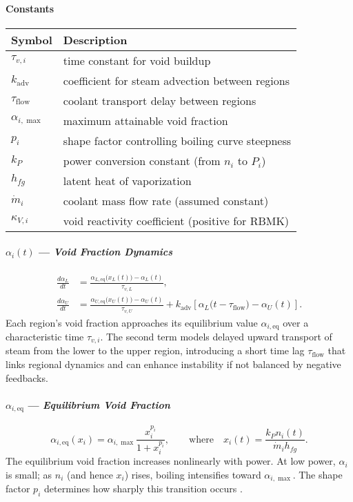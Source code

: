 \documentclass[11pt]{article}
\begin{document}
\paragraph{\textbf{Constants}}
\begin{center}
\begin{tabular}{@{}ll@{}}
\toprule
\textbf{Symbol} & \textbf{Description} \\
\midrule
$\tau_{v,i}$ & time constant for void buildup \\
$k_{\mathrm{adv}}$ & coefficient for steam advection between regions \\
$\tau_{\mathrm{flow}}$ & coolant transport delay between regions \\
$\alpha_{i,\max}$ & maximum attainable void fraction \\
$p_i$ & shape factor controlling boiling curve steepness \\
$k_P$ & power conversion constant (from $n_i$ to $P_i$) \\
$h_{fg}$ & latent heat of vaporization \\
$\dot{m}_i$ & coolant mass flow rate (assumed constant) \\
$\kappa_{V,i}$ & void reactivity coefficient (positive for RBMK) \\
\bottomrule
\end{tabular}
\end{center}

\paragraph{\textbf{$\alpha_i(t)$ --- \textit{Void Fraction Dynamics}}}
\begin{align}
\frac{d\alpha_L}{dt} &= 
\frac{\alpha_{L,\mathrm{eq}}\big(x_L(t)\big) - \alpha_L(t)}{\tau_{v,L}}, \\[3pt]
\frac{d\alpha_U}{dt} &= 
\frac{\alpha_{U,\mathrm{eq}}\big(x_U(t)\big) - \alpha_U(t)}{\tau_{v,U}} 
+ k_{\mathrm{adv}}\left[\alpha_L\big(t - \tau_{\mathrm{flow}}\big) - \alpha_U(t)\right].
\end{align}
Each region’s void fraction approaches its equilibrium value $\alpha_{i,\mathrm{eq}}$ over a characteristic time $\tau_{v,i}$. The second term models delayed upward transport of steam from the lower to the upper region, introducing a short time lag $\tau_{\mathrm{flow}}$ that links regional dynamics and can enhance instability if not balanced by negative feedbacks.

\paragraph{\textbf{$\alpha_{i,\mathrm{eq}}$ --- \textit{Equilibrium Void Fraction}}}
\begin{equation}
\alpha_{i,\mathrm{eq}}(x_i) = 
\alpha_{i,\max} \frac{x_i^{p_i}}{1 + x_i^{p_i}}, 
\qquad 
\text{where} \quad x_i(t) = \frac{k_P n_i(t)}{\dot{m}_i h_{fg}}.
\end{equation}
The equilibrium void fraction increases nonlinearly with power. At low power, $\alpha_i$ is small; as $n_i$ (and hence $x_i$) rises, boiling intensifies toward $\alpha_{i,\max}$. The shape factor $p_i$ determines how sharply this transition occurs \cite{Stacey2007}.
\end{document}
